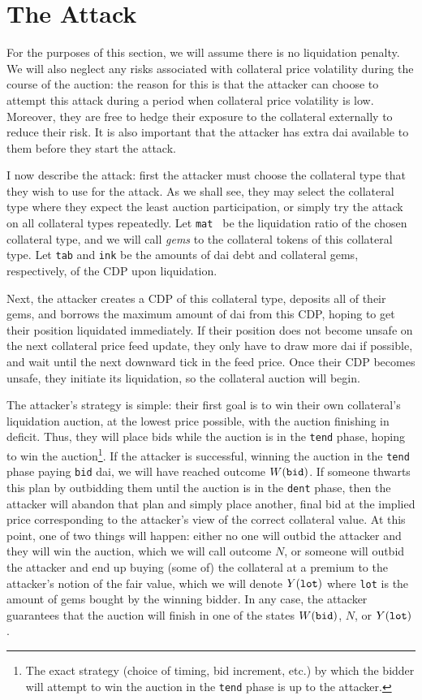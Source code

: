 \documentclass[a4paper,10pt]{article}
\begin{document}
\section{The Attack}
\par For the purposes of this section, we will assume there is no liquidation penalty. We will also neglect any risks associated with collateral price volatility during the course of the auction: the reason for this is that the attacker can choose to attempt this attack during a period when collateral price volatility is low. Moreover, they are free to hedge their exposure to the collateral externally to reduce their risk. It is also important that the attacker has extra dai available to them before they start the attack.
\par I now describe the attack: first the attacker must choose the collateral type that they wish to use for the attack. As we shall see, they may select the collateral type where they expect the least auction participation, or simply try the attack on all collateral types repeatedly. Let {\tt mat } be the liquidation ratio of the chosen collateral type, and we will call \emph{gems} to the collateral tokens of this collateral type. Let {\tt tab} and {\tt ink} be the amounts of dai debt and collateral gems, respectively, of the CDP upon liquidation.
\par Next, the attacker creates a CDP of this collateral type, deposits all of their gems, and borrows the maximum amount of dai from this CDP, hoping to get their position liquidated immediately. If their position does not become unsafe on the next collateral price feed update, they only have to draw more dai if possible, and wait until the next downward tick in the feed price. Once their CDP becomes unsafe, they initiate its liquidation, so the collateral auction will begin.
\par The attacker's strategy is simple: their first goal is to win their own collateral's liquidation auction, at the lowest price possible, with the auction finishing in deficit. Thus, they will place bids while the auction is in the {\tt tend} phase, hoping to win the auction\footnote{The exact strategy (choice of timing, bid increment, etc.) by which the bidder will attempt to win the auction in the {\tt tend} phase is up to the attacker.}. If the attacker is successful, winning the auction in the {\tt tend} phase paying {\tt bid} dai, we will have reached outcome $W({\tt bid})$. If someone thwarts this plan by outbidding them until the auction is in the {\tt dent} phase, then the attacker will abandon that plan and simply place another, final bid at the implied price corresponding to the attacker's view of the correct collateral value. At this point, one of two things will happen: either no one will outbid the attacker and they will win the auction, which we will call outcome $N$, or someone will outbid the attacker and end up buying (some of) the collateral at a premium to the attacker's notion of the fair value, which we will denote $Y({\tt lot})$ where {\tt lot} is the amount of gems bought by the winning bidder. In any case, the attacker guarantees that the auction will finish in one of the states $W({\tt bid})$, $N$, or $Y({\tt lot})$.
\end{document}
